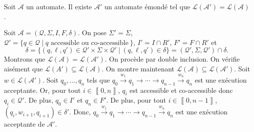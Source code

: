 \begin{prop}
	Soit $\mathcal{A}$\/ un automate. Il existe $\mathcal{A}'$\/ un automate émondé tel que $\mathcal{L}(\mathcal{A}') = \mathcal{L}(\mathcal{A})$.
\end{prop}

\begin{prv}
	Soit $\mathcal{A} = (\mathcal{Q}, \Sigma, I, F, \delta)$. On pose $\Sigma' = \Sigma$, $\mathcal{Q}' = \{q \in \mathcal{Q}  \mid q \text{ accessible ou co-accessible}\:\}$, $I' = I \cap R'$, $F' = F \cap R'$\/ et  \[
		\delta = \big\{(q,\ell,q') \in \mathcal{Q}' \times \Sigma \times \mathcal{Q}'\:\big|\: (q, \ell, q') \in \delta\big\} = (\mathcal{Q}', \Sigma, \mathcal{Q}') \cap \delta
	.\]
	Montrons que $\mathcal{L}(\mathcal{A}) = \mathcal{L}(\mathcal{A}')$. On procède par double inclusion. On vérifie aisément que $\mathcal{L}(A') \subseteq \mathcal{L}(\mathcal{A})$. On montre maintenant $\mathcal{L}(\mathcal{A}) \subseteq \mathcal{L}(\mathcal{A}')$. Soit $w \in \mathcal{L}(\mathcal{A}')$. Soit $q_0,\ldots,q_n$\/ tels que $q_0\xrightarrow{w_1} q_1 \to \cdots \to q_{n-1}\xrightarrow{w_n} q_n$\/ est une exécution acceptante. Or, pour tout $i \in \left\llbracket 0,n \right\rrbracket$, $q_i$\/ est accessible et co-accessible donc $q_i \in \mathcal{Q}'$. De plus, $q_0 \in I'$\/ et $q_n \in F'$. De plus, pour tout $i \in \left\llbracket 0,n-1 \right\rrbracket$, $(q_i, w_{i+1}, q_{i+1}) \in \delta'$. Donc, $q_0 \xrightarrow{w_1} q_1 \to \cdots \to q_{n-1}\xrightarrow{w_n} q_n$\/ est une exécution acceptante de $\mathcal{A}'$.
\end{prv}



